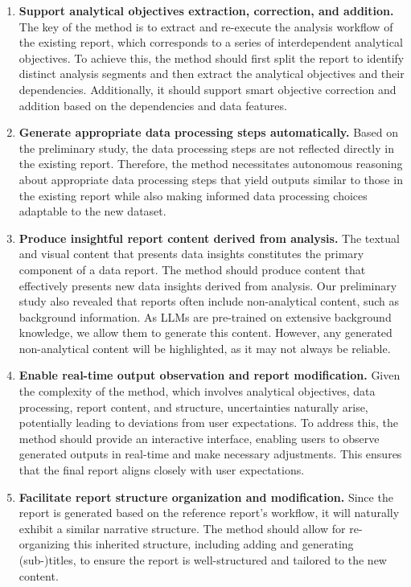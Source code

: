 \begin{enumerate}[label=\textbf{C\arabic*}]
\item \textbf{Support analytical objectives extraction, correction, and addition. } 
The key of the method is to extract and re-execute the analysis workflow of the existing report, which corresponds to a series of interdependent analytical objectives. 
To achieve this, the method should first split the report to identify distinct analysis segments and then extract the analytical objectives and their dependencies. 
Additionally, it should support smart objective correction and addition based on the dependencies and data features.

\item \textbf{Generate appropriate data processing steps automatically. } 
Based on the preliminary study, the data processing steps are not reflected directly in the existing report. 
Therefore, the method necessitates autonomous reasoning about appropriate data processing steps that yield outputs similar to those in the existing report while also making informed data processing choices adaptable to the new dataset. 

\item \textbf{Produce insightful report content derived from analysis. } 
The textual and visual content that presents data insights constitutes the primary component of a data report. 
The method should produce content that effectively presents new data insights derived from analysis. 
Our preliminary study also revealed that reports often include non-analytical content, such as background information. 
As LLMs are pre-trained on extensive background knowledge, we allow them to generate this content. 
However, any generated non-analytical content will be highlighted, as it may not always be reliable.

\item \textbf{Enable real-time output observation and report modification. } 
Given the complexity of the method, which involves analytical objectives, data processing, report content, and structure, uncertainties naturally arise, potentially leading to deviations from user expectations. 
To address this, the method should provide an interactive interface, enabling users to observe generated outputs in real-time and make necessary adjustments. This ensures that the final report aligns closely with user expectations. 

\item \textbf{Facilitate report structure organization and modification.}
Since the report is generated based on the reference report's workflow, it will naturally exhibit a similar narrative structure. 
The method should allow for re-organizing this inherited structure, including adding and generating (sub-)titles, to ensure the report is well-structured and tailored to the new content.
\end{enumerate}

